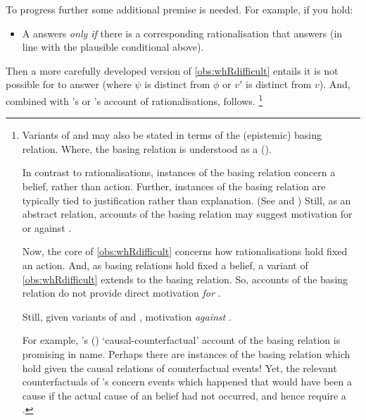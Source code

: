 \begin{note}
  To progress further some additional premise is needed.
  For example, if you hold:
  \begin{itemize}
  \item
    A \fingfr{} answers \qWhy{} \emph{only if} there is a corresponding rationalisation that answers \qWhyR{} (in line with the plausible conditional above).
  \end{itemize}
  Then a more carefully developed version of \autoref{obs:whRdifficult} entails it is not possible for  to answer \qWhy{} (where \(\psi\) is distinct from \(\phi\) or \(v'\) is distinct from \(v\)).
  And, combined with \citeauthor{Davidson:1963aa}'s or \citeauthor{Hieronymi:2011aa}'s account of rationalisations, \issueInclusion{} follows.%
  \footnote{
    Variants of \qWhy{} and \qHow{} may also be stated in terms of the (epistemic) basing relation.
    Where, the basing relation is understood as a  (\cite{Korcz:2021ue}).

    In contrast to rationalisations, instances of the basing relation concern a belief, rather than action.
    Further, instances of the basing relation are typically tied to justification rather than explanation.
    (See \cite{Korcz:2021ue} and \cite[35]{Pollock:1999tm})
    Still, as an abstract relation, accounts of the basing relation may suggest motivation for or against \issueInclusion{}.

    Now, the core of \autoref{obs:whRdifficult} concerns how rationalisations hold fixed an action.
    And, as basing relations hold fixed a belief, a variant of \autoref{obs:whRdifficult} extends to the basing relation.
    So, accounts of the basing relation do not provide direct motivation \emph{for} \issueInclusion{}.

    Still, given variants of \qWhy{} and \qHow{}, motivation \emph{against} \issueInclusion{}.

    For example, \citeauthor{Swain:1981wd}'s (\citeyear{Swain:1981wd}) `causal-counterfactual' account of the basing relation is promising in name.
    Perhaps there are instances of the basing relation which hold given the causal relations of counterfactual events!
    Yet, the relevant counterfactuals of \citeauthor{Swain:1981wd}'s concern events which happened that would have been a cause if the actual cause of an \agents{} belief had not occurred, and hence require a .

}
\end{note}
